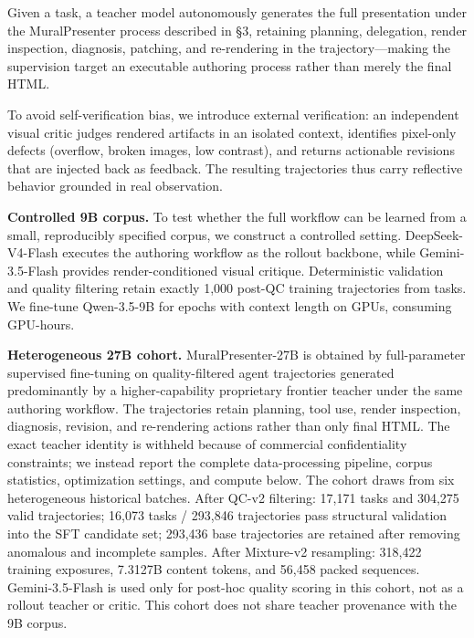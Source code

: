 Given a task, a teacher model autonomously generates the full presentation under the MuralPresenter process described in §3, retaining planning, delegation, render inspection, diagnosis, patching, and re-rendering in the trajectory—making the supervision target an executable authoring process rather than merely the final HTML.

To avoid self-verification bias, we introduce external verification: an independent visual critic judges rendered artifacts in an isolated context, identifies pixel-only defects (overflow, broken images, low contrast), and returns actionable revisions that are injected back as feedback. The resulting trajectories thus carry reflective behavior grounded in real observation.

\textbf{Controlled 9B corpus.} To test whether the full workflow can be learned from a small, reproducibly specified corpus, we construct a controlled setting. DeepSeek-V4-Flash executes the authoring workflow as the rollout backbone, while Gemini-3.5-Flash provides render-conditioned visual critique. Deterministic validation and quality filtering retain exactly 1,000 post-QC training trajectories from  tasks. We fine-tune Qwen-3.5-9B for  epochs with context length  on  GPUs, consuming  GPU-hours.

\textbf{Heterogeneous 27B cohort.} MuralPresenter-27B is obtained by full-parameter supervised fine-tuning on quality-filtered agent trajectories generated predominantly by a higher-capability proprietary frontier teacher under the same authoring workflow. The trajectories retain planning, tool use, render inspection, diagnosis, revision, and re-rendering actions rather than only final HTML. The exact teacher identity is withheld because of commercial confidentiality constraints; we instead report the complete data-processing pipeline, corpus statistics, optimization settings, and compute below. The cohort draws from six heterogeneous historical batches. After QC-v2 filtering: 17,171 tasks and 304,275 valid trajectories; 16,073 tasks / 293,846 trajectories pass structural validation into the SFT candidate set; 293,436 base trajectories are retained after removing anomalous and incomplete samples. After Mixture-v2 resampling: 318,422 training exposures, 7.3127B content tokens, and 56,458 packed sequences. Gemini-3.5-Flash is used only for post-hoc quality scoring in this cohort, not as a rollout teacher or critic. This cohort does not share teacher provenance with the 9B corpus.

